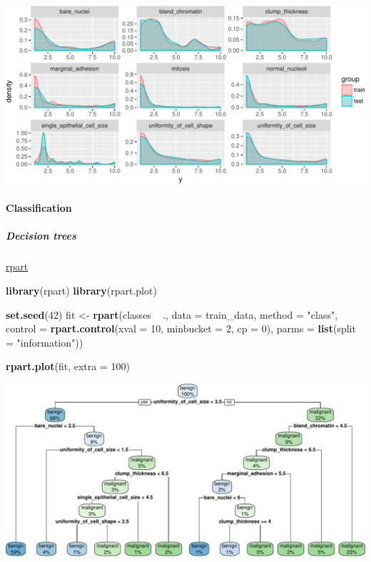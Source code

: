 \documentclass[]{article}
\newenvironment{Shaded}{\begin{snugshade}}{\end{snugshade}}
\newcommand{\KeywordTok}[1]{\textcolor[rgb]{0.13,0.29,0.53}{\textbf{{#1}}}}
\newcommand{\DataTypeTok}[1]{\textcolor[rgb]{0.13,0.29,0.53}{{#1}}}
\newcommand{\DecValTok}[1]{\textcolor[rgb]{0.00,0.00,0.81}{{#1}}}
\newcommand{\StringTok}[1]{\textcolor[rgb]{0.31,0.60,0.02}{{#1}}}
\newcommand{\NormalTok}[1]{{#1}}
\let\oldparagraph\paragraph
\renewcommand{\paragraph}[1]{\oldparagraph{#1}\mbox{}}
\let\oldsubparagraph\subparagraph
\renewcommand{\subparagraph}[1]{\oldsubparagraph{#1}\mbox{}}
\begin{document}
\begin{center}\includegraphics{webinar_code_files/figure-latex/distribution-1} \end{center}

\paragraph{Classification}\label{classification}

\subparagraph{Decision trees}\label{decision-trees}

\href{https://cran.r-project.org/web/packages/rpart/rpart.pdf}{rpart}

\begin{Shaded}
\begin{Highlighting}[]
\KeywordTok{library}\NormalTok{(rpart)}
\KeywordTok{library}\NormalTok{(rpart.plot)}

\KeywordTok{set.seed}\NormalTok{(}\DecValTok{42}\NormalTok{)}
\NormalTok{fit <-}\StringTok{ }\KeywordTok{rpart}\NormalTok{(classes ~}\StringTok{ }\NormalTok{.,}
            \DataTypeTok{data =} \NormalTok{train_data,}
            \DataTypeTok{method =} \StringTok{"class"}\NormalTok{,}
            \DataTypeTok{control =} \KeywordTok{rpart.control}\NormalTok{(}\DataTypeTok{xval =} \DecValTok{10}\NormalTok{, }
                                    \DataTypeTok{minbucket =} \DecValTok{2}\NormalTok{, }
                                    \DataTypeTok{cp =} \DecValTok{0}\NormalTok{), }
             \DataTypeTok{parms =} \KeywordTok{list}\NormalTok{(}\DataTypeTok{split =} \StringTok{"information"}\NormalTok{))}

\KeywordTok{rpart.plot}\NormalTok{(fit, }\DataTypeTok{extra =} \DecValTok{100}\NormalTok{)}
\end{Highlighting}
\end{Shaded}

\begin{center}\includegraphics{webinar_code_files/figure-latex/decision_tree-1} \end{center}
\end{document}
